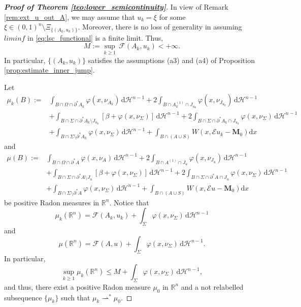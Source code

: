 \documentclass[reqno]{amsart}
\numberwithin{equation}{section}
\theoremstyle{plain}
\theoremstyle{definition}
\newcommand{\R}{\mathbb{R}}
\newcommand{\bM}{\mathbf{M}}
\newcommand{\cH}{\mathcal{H}}
\newcommand{\cF}{\mathcal{F}}
\newcommand{\p}{\partial}
\newcommand{\wk}{\rightharpoonup}
\renewcommand{\d}{\mathrm{d}}
\newcommand{\str}[1]{\mathcal{E}#1}
\newcommand{\substrate}{S}
\begin{document}
\begin{proof}[\textbf{Proof of Theorem \ref{teo:lower_semicontinuity}}]
In view of Remark \ref{rem:ext_u_out_A}, we may assume that $u_k=\xi$ for some $\xi\in (0,1)^n\setminus \Xi_{\{(A_k,u_k)\}}.$
Moreover, there is no loss of generality in assuming $liminf$ in \eqref{eq:lsc_functional} is a finite limit. Thus,
$$
M:=\sup\limits_{k\ge1} \,\cF(A_k,u_k)<+\infty.
$$
%
In particular, $\{(A_k,u_k)\}$ satisfies the assumptions (a3) and (a4) of Proposition \ref{prop:estimate_inner_jump}.

Let  
%
\begin{align*}
\mu_k(B):=  & \int_{B\cap \Omega\cap \p^*A_k} \varphi(x,\nu_{A_k})\,\d \cH^{n-1} + 2\int_{B\cap A_k^{(1)}\cap J_{u_k}} \varphi(x,\nu_{J_{u_k}}) \,\d\cH^{n-1} \nonumber \\
& +  \int_{B\cap \Sigma\cap \p^*A_k\setminus J_{u_k}} [\beta + \varphi(x,\nu_\Sigma)]\,\d\cH^{n-1} + 2\int_{B\cap \Sigma\cap \p^*A_k\cap J_{u_k}} \varphi(x,\nu_\Sigma)\,\d\cH^{n-1} \nonumber\\
& + \int_{B\cap \Sigma\setminus \p^*A_k} \varphi(x,\nu_\Sigma)\,\d\cH^{n-1} + \int_{B\cap (A\cup \substrate)} W(x,\str{u_k}-\bM_0)\d x
\end{align*}
and 
\begin{align*}
\mu(B):=  & \int_{B\cap \Omega\cap \p^*A} \varphi(x,\nu_A)\,\d \cH^{n-1} + 2\int_{B\cap A^{(1)} \cap J_u} \varphi(x,\nu_{J_u}) \,\d\cH^{n-1} \nonumber \\
& +  \int_{B\cap \Sigma\cap \p^*A\setminus J_u} [\beta + \varphi(x,\nu_\Sigma)]\,\d\cH^{n-1} + 2\int_{B\cap \Sigma\cap \p^*A\cap  J_u} \varphi(x,\nu_\Sigma)\,\d\cH^{n-1} \nonumber\\
& + \int_{B\cap \Sigma\setminus \p^*A} \varphi(x,\nu_\Sigma)\,\d\cH^{n-1}+\int_{B\cap (A\cup \substrate)} W(x,\str{u}-\bM_0)\d x
\end{align*}
%
be positive Radon measures in $\R^n.$
Notice that 
\begin{equation}\label{sankdnaida}
\mu_k(\R^n) = \cF(A_k,u_k) + \int_\Sigma \varphi(x,\nu_\Sigma)\,\d\cH^{n-1} 
\end{equation}
and
\begin{equation}\label{sandada1}
\mu(\R^n) = \cF(A,u) + \int_\Sigma \varphi(x,\nu_\Sigma)\,\d\cH^{n-1}. 
\end{equation}
%
In particular, 
$$
\sup\limits_{k\ge1} \mu_k(\R^n) \le M + \int_\Sigma \varphi(x,\nu_\Sigma)\,\d\cH^{n-1},
$$
and thus, there exist a positive Radon measure $\mu_0$ in $\R^n$ and a not relabelled subsequence $\{\mu_k\}$ such that $\mu_k\wk^* \mu_0.$ 

\end{proof}
\end{document}
